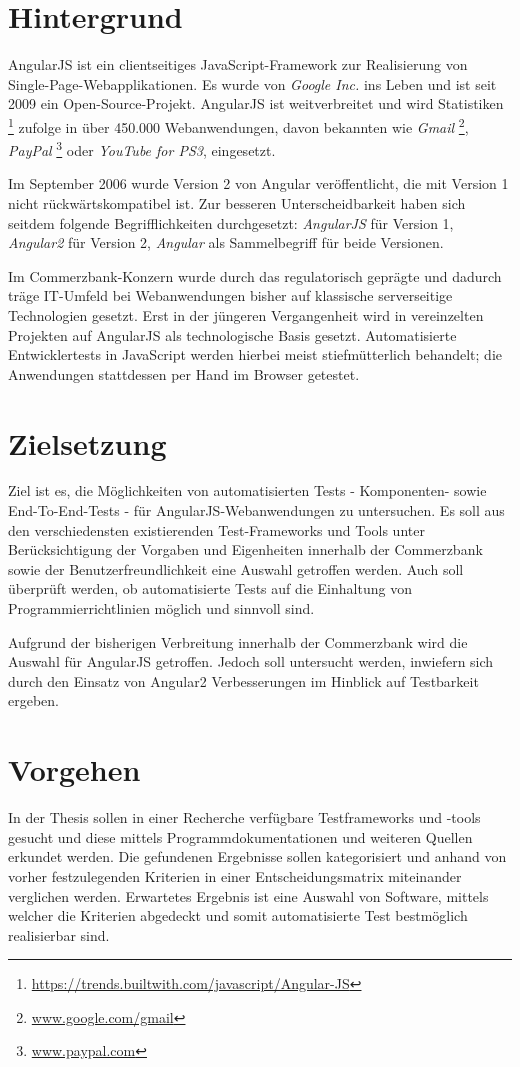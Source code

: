 \section{Hintergrund}\label{einleitung}
AngularJS ist ein clientseitiges JavaScript-Framework zur Realisierung von Single-Page-Webapplikationen. Es wurde von \textit{Google Inc.} ins Leben und ist seit 2009 ein Open-Source-Projekt. AngularJS ist weitverbreitet und wird Statistiken \footnote{\url{https://trends.builtwith.com/javascript/Angular-JS}} zufolge in über 450.000 Webanwendungen, davon bekannten wie \textit{Gmail} \footnote{\url{www.google.com/gmail}}, \textit{PayPal} \footnote{\url{www.paypal.com}} oder \textit{YouTube for PS3}, eingesetzt.

Im September 2006 wurde Version 2 von Angular veröffentlicht, die mit Version 1 nicht rückwärtskompatibel ist. Zur besseren Unterscheidbarkeit haben sich seitdem folgende Begrifflichkeiten durchgesetzt: \textit{AngularJS} für Version 1, \textit{Angular2} für Version 2, \textit{Angular} als Sammelbegriff für beide Versionen.

Im Commerzbank-Konzern wurde durch das regulatorisch geprägte und dadurch träge IT-Umfeld bei Webanwendungen bisher auf klassische serverseitige Technologien gesetzt. Erst in der jüngeren Vergangenheit wird in vereinzelten Projekten auf AngularJS als technologische Basis gesetzt. Automatisierte Entwicklertests in JavaScript werden hierbei meist stiefmütterlich behandelt; die Anwendungen stattdessen per Hand im Browser getestet.

\section{Zielsetzung}
Ziel ist es, die Möglichkeiten von automatisierten Tests - Komponenten- sowie End-To-End-Tests - für AngularJS-Webanwendungen zu untersuchen. Es soll aus den verschiedensten existierenden Test-Frameworks und Tools unter Berücksichtigung der Vorgaben und Eigenheiten innerhalb der Commerzbank sowie der Benutzerfreundlichkeit eine Auswahl getroffen werden. Auch soll überprüft werden, ob automatisierte Tests auf die Einhaltung von Programmierrichtlinien möglich und sinnvoll sind.

Aufgrund der bisherigen Verbreitung innerhalb der Commerzbank wird die Auswahl für AngularJS getroffen. Jedoch soll untersucht werden, inwiefern sich durch den Einsatz von Angular2 Verbesserungen im Hinblick auf Testbarkeit ergeben.


\section{Vorgehen}
In der Thesis sollen in einer Recherche verfügbare Testframeworks und -tools gesucht und diese mittels Programmdokumentationen und weiteren Quellen erkundet werden. Die gefundenen Ergebnisse sollen kategorisiert und anhand von vorher festzulegenden Kriterien in einer Entscheidungsmatrix miteinander verglichen werden. Erwartetes Ergebnis ist eine Auswahl von Software, mittels welcher die Kriterien abgedeckt und somit automatisierte Test bestmöglich realisierbar sind. 

